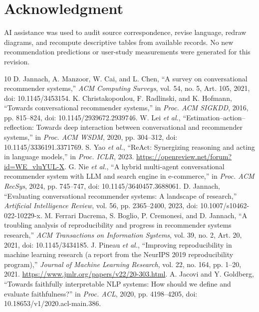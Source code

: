 \documentclass[conference,a4paper]{IEEEtran}
\begin{document}
\section*{Acknowledgment}
AI assistance was used to audit source correspondence, revise language, redraw diagrams, and recompute descriptive tables from available records. No new recommendation predictions or user-study measurements were generated for this revision.

\begin{thebibliography}{10}
D. Jannach, A. Manzoor, W. Cai, and L. Chen, “A survey on conversational recommender systems,” \emph{ACM Computing Surveys}, vol. 54, no. 5, Art. 105, 2021, doi: 10.1145/3453154.
K. Christakopoulou, F. Radlinski, and K. Hofmann, “Towards conversational recommender systems,” in \emph{Proc. ACM SIGKDD}, 2016, pp. 815--824, doi: 10.1145/2939672.2939746.
W. Lei \emph{et al.}, “Estimation--action--reflection: Towards deep interaction between conversational and recommender systems,” in \emph{Proc. ACM WSDM}, 2020, pp. 304--312, doi: 10.1145/3336191.3371769.
S. Yao \emph{et al.}, “ReAct: Synergizing reasoning and acting in language models,” in \emph{Proc. ICLR}, 2023. \url{https://openreview.net/forum?id=WE_vluYUL-X}.
G. Nie \emph{et al.}, “A hybrid multi-agent conversational recommender system with LLM and search engine in e-commerce,” in \emph{Proc. ACM RecSys}, 2024, pp. 745--747, doi: 10.1145/3640457.3688061.
D. Jannach, “Evaluating conversational recommender systems: A landscape of research,” \emph{Artificial Intelligence Review}, vol. 56, pp. 2365--2400, 2023, doi: 10.1007/s10462-022-10229-x.
M. Ferrari Dacrema, S. Boglio, P. Cremonesi, and D. Jannach, “A troubling analysis of reproducibility and progress in recommender systems research,” \emph{ACM Transactions on Information Systems}, vol. 39, no. 2, Art. 20, 2021, doi: 10.1145/3434185.
J. Pineau \emph{et al.}, “Improving reproducibility in machine learning research (a report from the NeurIPS 2019 reproducibility program),” \emph{Journal of Machine Learning Research}, vol. 22, no. 164, pp. 1--20, 2021. \url{https://www.jmlr.org/papers/v22/20-303.html}.
A. Jacovi and Y. Goldberg, “Towards faithfully interpretable NLP systems: How should we define and evaluate faithfulness?” in \emph{Proc. ACL}, 2020, pp. 4198--4205, doi: 10.18653/v1/2020.acl-main.386.
\end{thebibliography}
\end{document}
